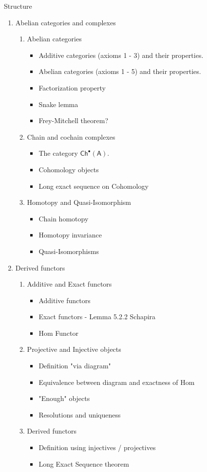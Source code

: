 \documentclass[../../main]{subfiles}
\begin{document}
Structure
\begin{enumerate}
  \item Abelian categories and complexes
  \begin{enumerate}
    \item Abelian categories
    \begin{itemize}
      \item Additive categories (axioms 1 - 3) and their properties.
      \item Abelian categories (axioms 1 - 5) and their properties.
      \item Factorization property
      \item Snake lemma
      \item Frey-Mitchell theorem?
    \end{itemize}
    \item Chain and cochain complexes
    \begin{itemize}
      \item The category \(\mathsf{Ch}^{\bullet}(\mathsf{A})\).
      \item Cohomology objects
      \item Long exact sequence on Cohomology
    \end{itemize}
    \item Homotopy and Quasi-Isomorphism
    \begin{itemize}
      \item Chain homotopy
      \item Homotopy invariance
      \item Quasi-Isomorphisms
    \end{itemize}
  \end{enumerate}
  \item Derived functors
  \begin{enumerate}
    \item Additive and Exact functors
    \begin{itemize}
      \item Additive functors
      \item Exact functors - Lemma 5.2.2 Schapira
      \item Hom Functor
    \end{itemize}
  \item Projective and Injective objects
  \begin{itemize}
    \item Definition "via diagram"
    \item Equivalence between diagram and exactness of Hom
    \item "Enough" objects
    \item Resolutions and uniqueness
  \end{itemize}
  \item Derived functors
  \begin{itemize}
    \item Definition using injectives / projectives
    \item Long Exact Sequence theorem
  \end{itemize}
  \end{enumerate}
\end{enumerate}
\end{document}
